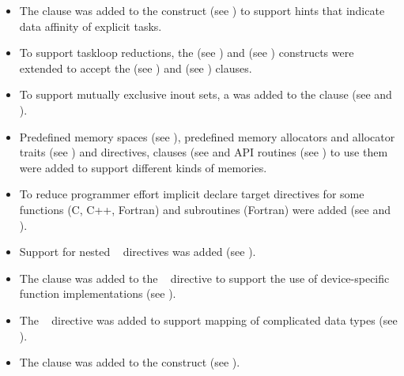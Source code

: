 \begin{itemize}
\item The  clause was added to the  construct
      (see ) to support hints that indicate 
      data affinity of explicit tasks.

\item To support taskloop reductions, the  (see
      ) and  (see
      ) constructs were extended
      to accept the  (see )
      and  (see )
      clauses.

\item To support mutually exclusive inout sets, a 
       was added to the  clause (see
       and ).

\item Predefined memory spaces (see ), 
      predefined memory allocators and allocator traits (see 
      ) and directives, clauses (see 
       and API routines (see 
      ) to use them were added 
      to support different kinds of memories.

\item To reduce programmer effort implicit declare target directives for
      some functions (C, C++, Fortran) and subroutines (Fortran) were added
      (see  and
      ).

\item Support for nested ~ directives was added
      (see ).

\item The  clause was added to the
      ~ directive to support the use of
      device-specific function implementations (see
      ).

\item The ~ directive was added to support
      mapping of complicated data types (see
      ).

\item The  clause was added to the  construct
      (see ).


\end{itemize}

